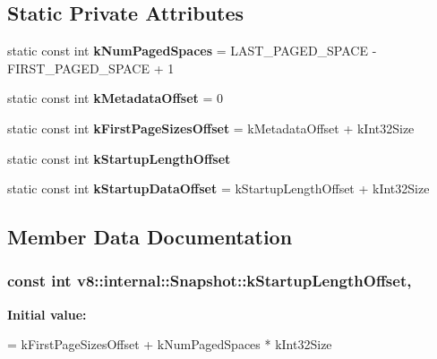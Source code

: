 \subsection*{Static Private Attributes}
\begin{DoxyCompactItemize}
\item 
static const int {\bfseries k\+Num\+Paged\+Spaces} = L\+A\+S\+T\+\_\+\+P\+A\+G\+E\+D\+\_\+\+S\+P\+A\+CE -\/ F\+I\+R\+S\+T\+\_\+\+P\+A\+G\+E\+D\+\_\+\+S\+P\+A\+CE + 1\hypertarget{classv8_1_1internal_1_1_snapshot_a00a76cfa3b053713564823dfadcc7df1}{}\label{classv8_1_1internal_1_1_snapshot_a00a76cfa3b053713564823dfadcc7df1}

\item 
static const int {\bfseries k\+Metadata\+Offset} = 0\hypertarget{classv8_1_1internal_1_1_snapshot_af18d3fbf418755af3bab0173a605b76a}{}\label{classv8_1_1internal_1_1_snapshot_af18d3fbf418755af3bab0173a605b76a}

\item 
static const int {\bfseries k\+First\+Page\+Sizes\+Offset} = k\+Metadata\+Offset + k\+Int32\+Size\hypertarget{classv8_1_1internal_1_1_snapshot_a123f8b29f13652ef287e06abebd22267}{}\label{classv8_1_1internal_1_1_snapshot_a123f8b29f13652ef287e06abebd22267}

\item 
static const int {\bfseries k\+Startup\+Length\+Offset}
\item 
static const int {\bfseries k\+Startup\+Data\+Offset} = k\+Startup\+Length\+Offset + k\+Int32\+Size\hypertarget{classv8_1_1internal_1_1_snapshot_ac7206067f085f98ff35cb8795adc8024}{}\label{classv8_1_1internal_1_1_snapshot_ac7206067f085f98ff35cb8795adc8024}

\end{DoxyCompactItemize}


\subsection{Member Data Documentation}
\subsubsection[{\texorpdfstring{k\+Startup\+Length\+Offset}{kStartupLengthOffset}}]{\setlength{\rightskip}{0pt plus 5cm}const int v8\+::internal\+::\+Snapshot\+::k\+Startup\+Length\+Offset\hspace{0.3cm}{\ttfamily [static]}, {\ttfamily [private]}}\hypertarget{classv8_1_1internal_1_1_snapshot_a5b923848e706bc62e79f69d980dcc55c}{}\label{classv8_1_1internal_1_1_snapshot_a5b923848e706bc62e79f69d980dcc55c}
{\bfseries Initial value\+:}
\begin{DoxyCode}
=
      kFirstPageSizesOffset + kNumPagedSpaces * kInt32Size
\end{DoxyCode}


